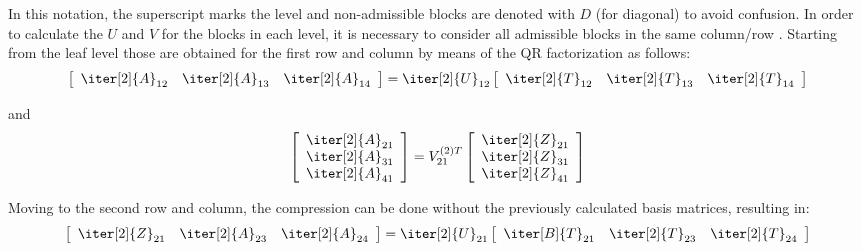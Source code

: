 \noindent In this notation, the superscript marks the level and non-admissible blocks are denoted with $D$ (for diagonal) to avoid confusion. In order to calculate the $U$ and $V$ for the blocks in each  level, it is necessary to consider all admissible blocks in the same column/row \cite{xia_fast_2010}. Starting from the leaf level those are obtained for the first row and column by means of the QR factorization as follows:
\begin{equation}
  \left[
    \begin{array}{ccc}
      \iter[2]{A}_{12} & \iter[2]{A}_{13}& \iter[2]{A}_{14} \\
    \end{array}
  \right]
  = \iter[2]{U}_{12}
  \left[
    \begin{array}{ccc}
      \iter[2]{T}_{12} & \iter[2]{T}_{13}& \iter[2]{T}_{14} \\
    \end{array}
  \right]
\end{equation}

\noindent and
\begin{equation}
  \left[
    \begin{array}{c}
      \iter[2]{A}_{21} \\
      \iter[2]{A}_{31} \\
      \iter[2]{A}_{41} \\
    \end{array}
  \right]
  = V_{21}^{(2)T}
  \left[
    \begin{array}{ccc}
      \iter[2]{Z}_{21} \\
      \iter[2]{Z}_{31} \\
      \iter[2]{Z}_{41} \\
    \end{array}
  \right]
\end{equation}

\noindent Moving to the second row and column, the compression can be done without the previously calculated basis matrices, resulting in:
\begin{equation}
  \left[
    \begin{array}{ccc}
      \iter[2]{Z}_{21} & \iter[2]{A}_{23}& \iter[2]{A}_{24} \\
    \end{array}
  \right]
  = \iter[2]{U}_{21}
  \left[
    \begin{array}{ccc}
      \iter[B]{T}_{21} & \iter[2]{T}_{23}& \iter[2]{T}_{24} \\
    \end{array}
  \right]
\end{equation}

